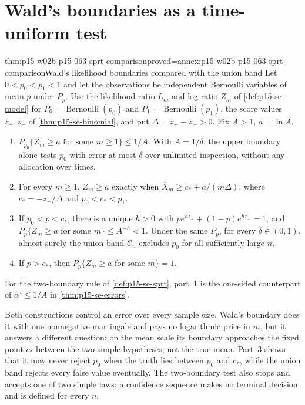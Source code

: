 \section{Wald's boundaries as a time-uniform test}
\label{sec:p15-w02b-p15-063-wald}

\begin{hbtheorem}{thm:p15-w02b-p15-063-sprt-comparison}{proved=annex:p15-w02b-p15-063-sprt-comparison}{Wald's likelihood boundaries compared with the union band}
Let \(0<p_0<p_1<1\) and let the observations be independent Bernoulli
variables of mean \(p\) under \(P_p\). Use the likelihood ratio \(L_m\)
and log ratio \(Z_m\) of \cref{def:p15-se-model} for
\(P_0=\operatorname{Bernoulli}(p_0)\) and
\(P_1=\operatorname{Bernoulli}(p_1)\), the score values \(z_+,z_-\) of
\cref{thm:p15-se-binomial}, and put \(\Delta=z_+-z_->0\). Fix \(A>1\),
\(a=\ln A\).
\begin{enumerate}
\item \(P_{p_0}\{Z_m\geq a\text{ for some }m\geq1\}\leq1/A\). With
 \(A=1/\delta\), the upper boundary alone tests \(p_0\) with error at most
 \(\delta\) over unlimited inspection, without any allocation over times.
\item For every \(m\geq1\),
 \(Z_m\geq a\) exactly when
 \(\overline X_m\geq c_*+a/(m\Delta)\), where \(c_*=-z_-/\Delta\) and
 \(p_0<c_*<p_1\).
\item If \(p_0<p<c_*\), there is a unique \(h>0\) with
 \(pe^{hz_+}+(1-p)e^{hz_-}=1\), and
 \(P_p\{Z_m\geq a\text{ for some }m\}\leq A^{-h}<1\). Under the same
 \(P_p\), for every \(\delta\in(0,1)\), almost surely the union band
 \(\mathcal C_n\) excludes \(p_0\) for all sufficiently large \(n\).
\item If \(p>c_*\), then \(P_p\{Z_m\geq a\text{ for some }m\}=1\).
\end{enumerate}
For the two-boundary rule of \cref{def:p15-se-sprt}, part~1 is the
one-sided counterpart of \(\alpha'\leq1/A\) in
\cref{thm:p15-se-errors}.
\end{hbtheorem}

Both constructions control an error over every sample size. Wald's
boundary does it with one nonnegative martingale and pays no logarithmic
price in \(m\), but it answers a different question: on the mean scale its
boundary approaches the fixed point \(c_*\) between the two simple
hypotheses, not the true mean. Part~3 shows that it may never reject
\(p_0\) when the truth lies between \(p_0\) and \(c_*\), while the
union band rejects every false value eventually. The two-boundary test
also stops and accepts one of two simple laws; a confidence sequence makes
no terminal decision and is defined for every \(n\).

